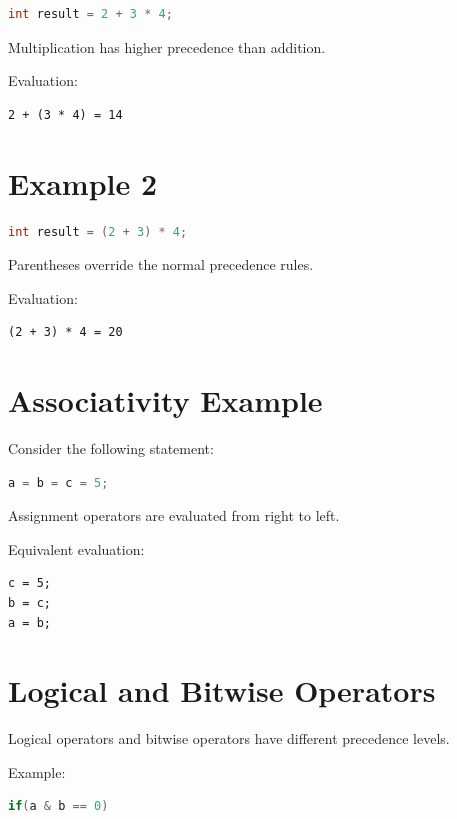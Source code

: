 \documentclass[12pt,openany]{book}
\begin{document}
\begin{lstlisting}[language=C]
int result = 2 + 3 * 4;
\end{lstlisting}

Multiplication has higher precedence than addition.

Evaluation:

\begin{lstlisting}
2 + (3 * 4) = 14
\end{lstlisting}

\section{Example 2}

\begin{lstlisting}[language=C]
int result = (2 + 3) * 4;
\end{lstlisting}

Parentheses override the normal precedence rules.

Evaluation:

\begin{lstlisting}
(2 + 3) * 4 = 20
\end{lstlisting}

\section{Associativity Example}

Consider the following statement:

\begin{lstlisting}[language=C]
a = b = c = 5;
\end{lstlisting}

Assignment operators are evaluated from right to left.

Equivalent evaluation:

\begin{lstlisting}
c = 5;
b = c;
a = b;
\end{lstlisting}

\section{Logical and Bitwise Operators}

Logical operators and bitwise operators have different precedence levels.

Example:

\begin{lstlisting}[language=C]
if(a & b == 0)
\end{lstlisting}
\end{document}
